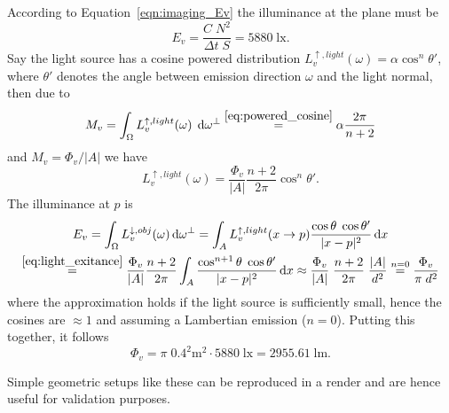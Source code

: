 According to Equation~\eqref{eqn:imaging_Ev} the illuminance at the plane must be 
\begin{displaymath}
  E_v = \frac{C\;N^2}{\Delta t\; S} = 5880\; \unit{\lux}.
\end{displaymath}
Say the light source has a cosine powered distribution
$L_v^{\uparrow,light}(\omega) = \alpha \cos^n \theta'$, where
$\theta'$ denotes the angle between emission direction $\omega$ and
the light normal, then due to
\begin{displaymath}
  M_v = \int_\Omega L_v^{\uparrow,light}(\omega) \; \mathop{}\!\mathrm{d} \omega^\bot \stackrel{\eqref{eq:powered_cosine}}= \alpha \frac{2\pi}{n+2}
\end{displaymath}
and $M_v = \Phi_v / |A|$
we have
\begin{equation}\label{eq:light_exitance}
  L_v^{\uparrow,light}(\omega) = \frac{\Phi_v}{|A|} \frac{n+2}{2\pi} \cos^n \theta'.
\end{equation}
The illuminance at $p$ is
\begin{multline*}
  E_v = \int_\Omega L_v^{\downarrow,obj}(\omega) \mathop{}\!\mathrm{d}\omega^{\bot} = \int_A L_v^{\uparrow,light}(x\to p) \frac{\cos \theta\; \cos \theta'}{|x-p|^2} \mathop{}\!\mathrm{d} x \\
  \stackrel{\eqref{eq:light_exitance}} =  \frac{\Phi_v}{|A|} \frac{n+2}{2\pi} \int_A  \frac{\cos^{n+1} \theta\; \cos \theta'}{|x-p|^2} \mathop{}\!\mathrm{d} x
  \approx \frac{ \Phi_v }{|A|}\; \frac{n+2}{2\pi}\; \frac{|A|}{d^2} \stackrel{n=0}= \frac{\Phi_v}{\pi\;d^2}
\end{multline*}
where the approximation holds if the light source is sufficiently small, hence the cosines are $\approx 1$ and assuming a Lambertian emission ($n=0$).
Putting this together, it follows 
\begin{displaymath}
  \Phi_v = \pi \; 0.4^2 \unit{\square\meter}\cdot 5880\; \unit{\lux} = 2955.61\; \unit{\lumen}.
\end{displaymath}

Simple geometric setups like these can be reproduced in a render and are hence useful for validation purposes.

